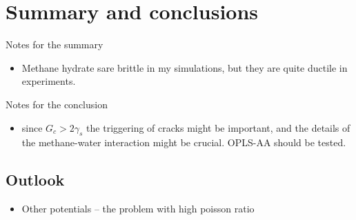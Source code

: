 \chapter{Summary and conclusions}

Notes for the summary
\begin{itemize}
\item Methane hydrate sare brittle in my simulations, but they are quite ductile in experiments.
\end{itemize}

Notes for the conclusion
\begin{itemize}
\item since $G_c > 2\gamma_s$ the triggering of cracks might be important, and the details of the methane-water interaction might be crucial. OPLS-AA should be tested.
\end{itemize}


\section{Outlook}
\begin{itemize}
\item Other potentials – the problem with high poisson ratio

\end{itemize}